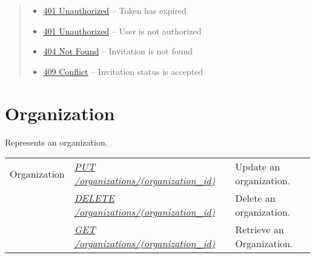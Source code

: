 \documentclass[letterpaper,10pt,english]{sphinxmanual}
\begin{document}
\begin{fulllineitems}
\begin{quote}
\begin{description}
\begin{itemize}
\item {} 
\href{http://www.w3.org/Protocols/rfc2616/rfc2616-sec10.html\#sec10.4.2}{401 Unauthorized} -- Token has expired

\item {} 
\href{http://www.w3.org/Protocols/rfc2616/rfc2616-sec10.html\#sec10.4.2}{401 Unauthorized} -- User is not authorized

\item {} 
\href{http://www.w3.org/Protocols/rfc2616/rfc2616-sec10.html\#sec10.4.5}{404 Not Found} -- Invitation is not found

\item {} 
\href{http://www.w3.org/Protocols/rfc2616/rfc2616-sec10.html\#sec10.4.10}{409 Conflict} -- Invitation status is accepted

\end{itemize}

\end{description}\end{quote}

\end{fulllineitems}



\section{Organization}
\label{\detokenize{resources/organization:organization}}\label{\detokenize{resources/organization::doc}}\label{\detokenize{resources/organization:id1}}
Represents an organization.

\noindent\begin{tabulary}{\linewidth}{|L|L|L|}
\hline
{}\relax &\relax &\relax \\
\hline
Organization
&
{\hyperref[\detokenize{resources/organization:put--organizations-(organization_id)}]{\emph{PUT /organizations/(organization\_id)}}}
&
Update an organization.
\\
\hline&
{\hyperref[\detokenize{resources/organization:delete--organizations-(organization_id)}]{\emph{DELETE /organizations/(organization\_id)}}}
&
Delete an organization.
\\
\hline&
{\hyperref[\detokenize{resources/organization:get--organizations-(organization_id)}]{\emph{GET /organizations/(organization\_id)}}}
&
Retrieve an Organization.
\\
\hline\end{tabulary}
\end{document}
